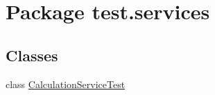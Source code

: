 \hypertarget{namespacetest_1_1services}{}\section{Package test.\+services}
\label{namespacetest_1_1services}
\subsection*{Classes}
\begin{DoxyCompactItemize}
\item 
class \hyperlink{classtest_1_1services_1_1_calculation_service_test}{Calculation\+Service\+Test}
\end{DoxyCompactItemize}
